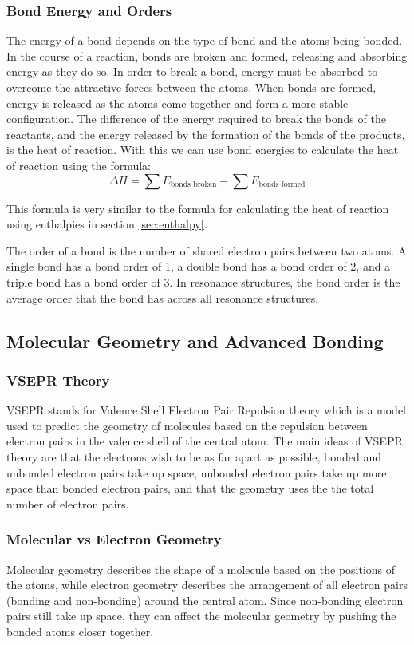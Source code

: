\subsubsection{Bond Energy and Orders}
The energy of a bond depends on the type of bond and the atoms being bonded. In the course of a reaction, bonds are broken and formed, releasing and absorbing energy as they do so. In order to break a bond, energy must be absorbed to overcome the attractive forces between the atoms. When bonds are formed, energy is released as the atoms come together and form a more stable configuration. The difference of the energy required to break the bonds of the reactants, and the energy released by the formation of the bonds of the products, is the heat of reaction. With this we can use bond energies to calculate the heat of reaction using the formula:
\begin{equation}\label{eq:bondEnergy}
    \Delta H = \sum E_\text{bonds broken} - \sum E_\text{bonds formed}
\end{equation}

This formula is very similar to the formula for calculating the heat of reaction using enthalpies in section \ref{sec:enthalpy}.

The order of a bond is the number of shared electron pairs between two atoms. A single bond has a bond order of 1, a double bond has a bond order of 2, and a triple bond has a bond order of 3. In resonance structures, the bond order is the average order that the bond has across all resonance structures. 
\subsection{Molecular Geometry and Advanced Bonding}
\subsubsection{VSEPR Theory}
VSEPR stands for Valence Shell Electron Pair Repulsion theory which is a model used to predict the geometry of molecules based on the repulsion between electron pairs in the valence shell of the central atom. The main ideas of VSEPR theory are that the electrons wish to be as far apart as possible, bonded and unbonded electron pairs take up space, unbonded electron pairs take up more space than bonded electron pairs, and that the geometry uses the the total number of electron pairs.
\subsubsection{Molecular vs Electron Geometry}
Molecular geometry describes the shape of a molecule based on the positions of the atoms, while electron geometry describes the arrangement of all electron pairs (bonding and non-bonding) around the central atom. Since non-bonding electron pairs still take up space, they can affect the molecular geometry by pushing the bonded atoms closer together. 
